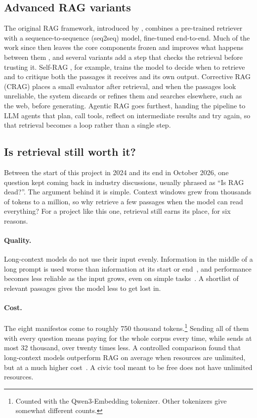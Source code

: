 \subsection{Advanced RAG variants} \label{subsec:sota-variants}

The original RAG framework, introduced by \citet{rag-nlp}, combines a pre-trained retriever with a sequence-to-sequence (seq2seq) model, fine-tuned end-to-end. Much of the work since then leaves the core components frozen and improves what happens between them \citep{rag-survey}, and several variants add a step that checks the retrieval before trusting it. Self-RAG \citep{asai2024selfrag}, for example, trains the model to decide when to retrieve and to critique both the passages it receives and its own output. Corrective RAG (CRAG) \citep{crag} places a small evaluator after retrieval, and when the passages look unreliable, the system discards or refines them and searches elsewhere, such as the web, before generating. Agentic RAG \citep{agentic-rag} goes furthest, handing the pipeline to LLM agents that plan, call tools, reflect on intermediate results and try again, so that retrieval becomes a loop rather than a single step.

\subsection{Is retrieval still worth it?} \label{subsec:sota-why-rag}

Between the start of this project in 2024 and its end in October 2026, one question kept coming back in industry discussions, usually phrased as ``Is RAG dead?''. The argument behind it is simple. Context windows grew from thousands of tokens to a million, so why retrieve a few passages when the model can read everything? For a project like this one, retrieval still earns its place, for six reasons.

\paragraph{Quality.} Long-context models do not use their input evenly. Information in the middle of a long prompt is used worse than information at its start or end~\citep{liu2024lostinthemiddle}, and performance becomes less reliable as the input grows, even on simple tasks~\citep{hong2025contextrot}. A shortlist of relevant passages gives the model less to get lost in.

\paragraph{Cost.} The eight manifestos come to roughly 750 thousand tokens.\footnote{Counted with the Qwen3-Embedding tokenizer. Other tokenizers give somewhat different counts.} Sending all of them with every question means paying for the whole corpus every time, while \sysname{} sends at most 32 thousand, over twenty times less. A controlled comparison found that long-context models outperform RAG on average when resources are unlimited, but at a much higher cost~\citep{li2024ragorlongcontext}. A civic tool meant to be free does not have unlimited resources.

